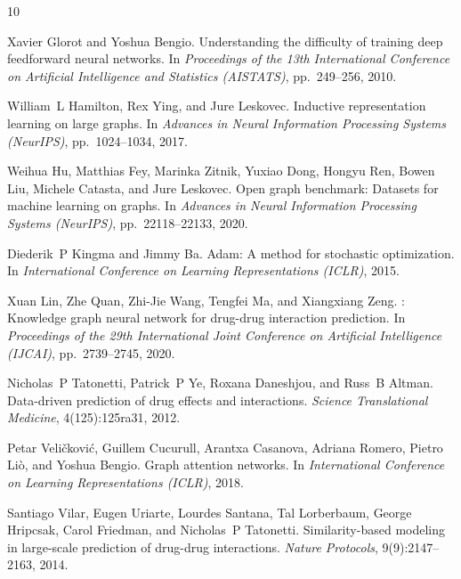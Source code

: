 \documentclass{article}
\begin{document}


\begin{thebibliography}{10}

Xavier Glorot and Yoshua Bengio.
\newblock Understanding the difficulty of training deep feedforward neural networks.
\newblock In \emph{Proceedings of the 13th International Conference on Artificial Intelligence and Statistics (AISTATS)}, pp.\ 249--256, 2010.

William~L Hamilton, Rex Ying, and Jure Leskovec.
\newblock Inductive representation learning on large graphs.
\newblock In \emph{Advances in Neural Information Processing Systems (NeurIPS)}, pp.\ 1024--1034, 2017.

Weihua Hu, Matthias Fey, Marinka Zitnik, Yuxiao Dong, Hongyu Ren, Bowen Liu, Michele Catasta, and Jure Leskovec.
\newblock Open graph benchmark: Datasets for machine learning on graphs.
\newblock In \emph{Advances in Neural Information Processing Systems (NeurIPS)}, pp.\ 22118--22133, 2020.

Diederik~P Kingma and Jimmy Ba.
\newblock Adam: A method for stochastic optimization.
\newblock In \emph{International Conference on Learning Representations (ICLR)}, 2015.

Xuan Lin, Zhe Quan, Zhi-Jie Wang, Tengfei Ma, and Xiangxiang Zeng.
: Knowledge graph neural network for drug-drug interaction prediction.
\newblock In \emph{Proceedings of the 29th International Joint Conference on Artificial Intelligence (IJCAI)}, pp.\ 2739--2745, 2020.

Nicholas~P Tatonetti, Patrick~P Ye, Roxana Daneshjou, and Russ~B Altman.
\newblock Data-driven prediction of drug effects and interactions.
\newblock \emph{Science Translational Medicine}, 4(125):125ra31, 2012.

Petar Veli{\v{c}}kovi{\'c}, Guillem Cucurull, Arantxa Casanova, Adriana Romero, Pietro Li{\`o}, and Yoshua Bengio.
\newblock Graph attention networks.
\newblock In \emph{International Conference on Learning Representations (ICLR)}, 2018.

Santiago Vilar, Eugen Uriarte, Lourdes Santana, Tal Lorberbaum, George Hripcsak, Carol Friedman, and Nicholas~P Tatonetti.
\newblock Similarity-based modeling in large-scale prediction of drug-drug interactions.
\newblock \emph{Nature Protocols}, 9(9):2147--2163, 2014.


\end{thebibliography}
\end{document}
